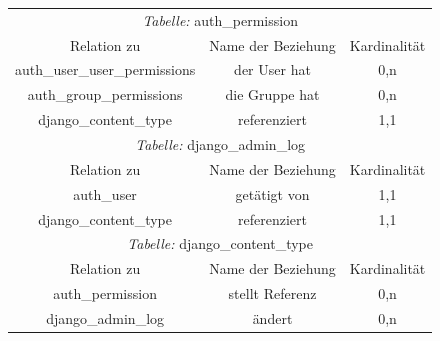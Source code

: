 \begin{longtable}{@{}ccc@{}}
  \toprule
  \multicolumn{3}{c}{\emph{Tabelle:} auth\_permission} \\
  Relation zu & Name der Beziehung & Kardinalität \\
  \cmidrule(lr){1-1}\cmidrule(lr){2-2}\cmidrule(lr){3-3}
  auth\_user\_user\_permissions & der User hat  & 0,n \\
  auth\_group\_permissions & die Gruppe hat & 0,n \\
  django\_content\_type & referenziert & 1,1 \\

  \toprule
  \multicolumn{3}{c}{\emph{Tabelle:} django\_admin\_log} \\
  Relation zu & Name der Beziehung & Kardinalität \\
  \cmidrule(lr){1-1}\cmidrule(lr){2-2}\cmidrule(lr){3-3}
  auth\_user & getätigt von  & 1,1 \\
  django\_content\_type & referenziert & 1,1 \\

  \toprule
  \multicolumn{3}{c}{\emph{Tabelle:} django\_content\_type} \\
  Relation zu & Name der Beziehung & Kardinalität \\
  \cmidrule(lr){1-1}\cmidrule(lr){2-2}\cmidrule(lr){3-3}
  auth\_permission & stellt Referenz  & 0,n \\
  django\_admin\_log & ändert & 0,n \\
\end{longtable}
